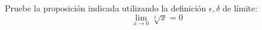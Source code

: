 \item Pruebe la proposición indicada utilizando la definición $\epsilon, \delta$ de límite:
$$\lim_{x \to 0} \sqrt[3]{x} = 0$$
